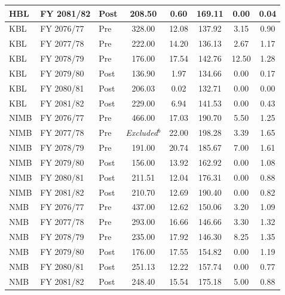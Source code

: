 {\begin{longtable}{lllccccc}
\addlinespace
HBL   & FY 2081/82 & Post & 208.50 & 0.60  & 169.11 & 0.00  & 0.04 \\
\midrule
KBL   & FY 2076/77 & Pre  & 328.00 & 12.08 & 137.92 & 3.15  & 0.90 \\
\addlinespace
KBL   & FY 2077/78 & Pre  & 222.00 & 14.20 & 136.13 & 2.67  & 1.17 \\
\addlinespace
KBL   & FY 2078/79 & Pre  & 176.00 & 17.54 & 142.76 & 12.50 & 1.28 \\
\addlinespace
KBL   & FY 2079/80 & Post & 136.90 & 1.97  & 134.66 & 0.00  & 0.17 \\
\addlinespace
KBL   & FY 2080/81 & Post & 206.03 & 0.02  & 132.71 & 0.00  & 0.00 \\
\addlinespace
KBL   & FY 2081/82 & Post & 229.00 & 6.94  & 141.53 & 0.00  & 0.43 \\
\midrule
NIMB  & FY 2076/77 & Pre  & 466.00 & 17.03 & 190.70 & 5.50  & 1.25 \\
\addlinespace
NIMB  & FY 2077/78 & Pre  & \textit{Excluded}$^b$ & 22.00 & 198.28 & 3.39  & 1.65 \\
\addlinespace
NIMB  & FY 2078/79 & Pre  & 191.00 & 20.74 & 185.67 & 7.00  & 1.61 \\
\addlinespace
NIMB  & FY 2079/80 & Post & 156.00 & 13.92 & 162.92 & 0.00  & 1.08 \\
\addlinespace
NIMB  & FY 2080/81 & Post & 211.51 & 12.04 & 176.31 & 0.00  & 0.88 \\
\addlinespace
NIMB  & FY 2081/82 & Post & 210.70 & 12.69 & 190.40 & 0.00  & 0.82 \\
\midrule
NMB   & FY 2076/77 & Pre  & 437.00 & 12.62 & 150.06 & 3.20  & 1.09 \\
\addlinespace
NMB   & FY 2077/78 & Pre  & 293.00 & 16.66 & 146.66 & 3.30  & 1.32 \\
\addlinespace
NMB   & FY 2078/79 & Pre  & 235.00 & 17.92 & 146.30 & 8.25  & 1.35 \\
\addlinespace
NMB   & FY 2079/80 & Post & 176.00 & 17.55 & 154.82 & 0.00  & 1.19 \\
\addlinespace
NMB   & FY 2080/81 & Post & 251.13 & 12.22 & 157.74 & 0.00  & 0.77 \\
\addlinespace
NMB   & FY 2081/82 & Post & 248.40 & 15.54 & 175.18 & 5.00  & 0.88 \\
\bottomrule
\end{longtable}}

